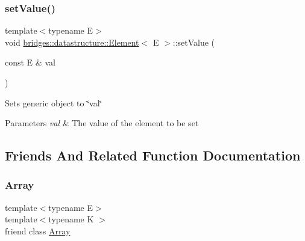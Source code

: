 \subsubsection{\texorpdfstring{set\+Value()}{setValue()}}
{\footnotesize\ttfamily template$<$typename E$>$ \\
void \mbox{\hyperlink{classbridges_1_1datastructure_1_1_element}{bridges\+::datastructure\+::\+Element}}$<$ E $>$\+::set\+Value (\begin{DoxyParamCaption}\item[{const E \&}]{val }\end{DoxyParamCaption})\hspace{0.3cm}{\ttfamily [inline]}}

Sets generic object to \char`\"{}val\char`\"{}


\begin{DoxyParams}{Parameters}
{\em val} & The value of the element to be set \\
\hline
\end{DoxyParams}


\subsection{Friends And Related Function Documentation}
\mbox{\label{classbridges_1_1datastructure_1_1_element_ab1a595168ea1870ce436dfd2d8e69b6d}} 
\subsubsection{\texorpdfstring{Array}{Array}}
{\footnotesize\ttfamily template$<$typename E$>$ \\
template$<$typename K $>$ \\
friend class \mbox{\hyperlink{classbridges_1_1datastructure_1_1_array}{Array}}\hspace{0.3cm}{\ttfamily [friend]}}

\mbox{\label{classbridges_1_1datastructure_1_1_element_a71a2fa1cdcc1e193c1790c39b8267780}} 
